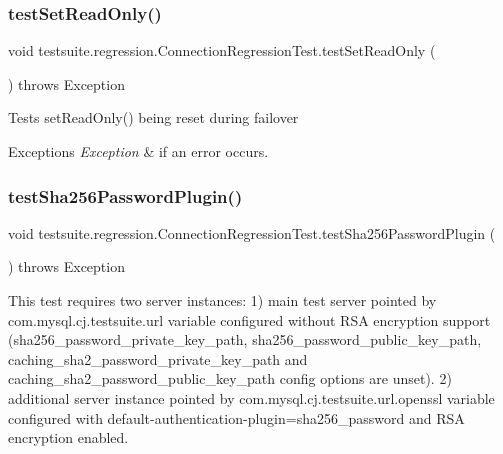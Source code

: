 \mbox{\label{classtestsuite_1_1regression_1_1_connection_regression_test_ae79808e3889aec702379cc6fe4163e22}} 
\subsubsection{\texorpdfstring{test\+Set\+Read\+Only()}{testSetReadOnly()}}
{\footnotesize\ttfamily void testsuite.\+regression.\+Connection\+Regression\+Test.\+test\+Set\+Read\+Only (\begin{DoxyParamCaption}{ }\end{DoxyParamCaption}) throws Exception}

Tests set\+Read\+Only() being reset during failover


\begin{DoxyExceptions}{Exceptions}
{\em Exception} & if an error occurs. \\
\hline
\end{DoxyExceptions}
\mbox{\label{classtestsuite_1_1regression_1_1_connection_regression_test_a40ea24784903b1b96d51638e255bce89}} 
\subsubsection{\texorpdfstring{test\+Sha256\+Password\+Plugin()}{testSha256PasswordPlugin()}}
{\footnotesize\ttfamily void testsuite.\+regression.\+Connection\+Regression\+Test.\+test\+Sha256\+Password\+Plugin (\begin{DoxyParamCaption}{ }\end{DoxyParamCaption}) throws Exception}

This test requires two server instances\+: 1) main test server pointed by com.\+mysql.\+cj.\+testsuite.\+url variable configured without R\+SA encryption support (sha256\+\_\+password\+\_\+private\+\_\+key\+\_\+path, sha256\+\_\+password\+\_\+public\+\_\+key\+\_\+path, caching\+\_\+sha2\+\_\+password\+\_\+private\+\_\+key\+\_\+path and caching\+\_\+sha2\+\_\+password\+\_\+public\+\_\+key\+\_\+path config options are unset). 2) additional server instance pointed by com.\+mysql.\+cj.\+testsuite.\+url.\+openssl variable configured with default-\/authentication-\/plugin=sha256\+\_\+password and R\+SA encryption enabled.

